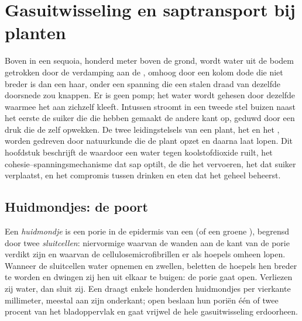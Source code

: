 \chapter{Gasuitwisseling en saptransport bij planten}\label{ch:b1:plant-transport}

Boven in een sequoia, honderd meter boven de grond, wordt water uit de
bodem getrokken door de verdamping aan de , omhoog door een kolom
dode  die niet breder is dan een haar, onder een spanning die een
stalen draad van dezelfde doorsnede zou knappen. Er is geen pomp; het water
wordt gehesen door dezelfde  waarmee het aan zichzelf
kleeft. Intussen stroomt in een tweede stel buizen naast het eerste de
suiker die die  hebben gemaakt de andere kant op, geduwd door een
druk die de  zelf opwekken. De twee leidingstelsels van een plant,
het  en het , worden gedreven door natuurkunde die de plant
opzet en daarna laat lopen. Dit hoofdstuk beschrijft de 
waardoor een  water tegen koolstofdioxide ruilt, het
cohesie--spanningsmechanisme dat sap optilt, de  die het vervoeren,
het  dat suiker verplaatst, en het compromis tussen
drinken en eten dat het geheel beheerst.

\section{Huidmondjes: de poort}

\begin{definition}\label{def:b1:plant-transport:stoma}
Een \emph{huidmondje} is een porie in de epidermis van een  (of een
groene ), begrensd door twee \emph{sluitcellen}: niervormige 
waarvan de wanden aan de kant van de porie verdikt zijn en waarvan de
cellulosemicrofibrillen er als hoepels omheen lopen. Wanneer de sluitcellen
water opnemen en zwellen, beletten de hoepels hen breder te worden en
dwingen zij hen uit elkaar te buigen: de porie gaat open. Verliezen zij
water, dan sluit zij. Een  draagt enkele honderden huidmondjes per
vierkante millimeter, meestal aan zijn onderkant; open beslaan hun poriën
één of twee procent van het bladoppervlak en gaat vrijwel de hele
gasuitwisseling erdoorheen.
\end{definition}

